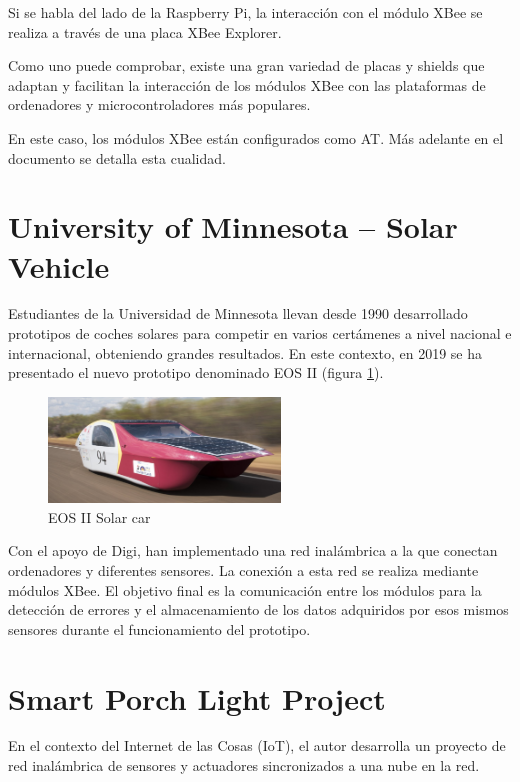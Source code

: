 Si se habla del lado de la Raspberry Pi, la interacción con el módulo XBee se realiza a través de una placa XBee Explorer.

Como uno puede comprobar, existe una gran variedad de placas y shields que adaptan y facilitan la interacción de los módulos XBee con las plataformas de ordenadores y microcontroladores más populares.

En este caso, los módulos XBee están configurados como AT. Más adelante en el documento se detalla esta cualidad.

\section{University of Minnesota – Solar Vehicle \cite{UM:SV}}

Estudiantes de la Universidad de Minnesota llevan desde 1990 desarrollado prototipos de coches solares para competir en varios certámenes a nivel nacional e internacional, obteniendo grandes resultados. En este contexto, en 2019 se ha presentado el nuevo prototipo denominado EOS II (figura \ref{fig:EArte3}). 

\begin{figure}[b]
\centering
\includegraphics[width=0.55\textwidth]{figuras/EArte3.png}
\caption{EOS II Solar car}
\label{fig:EArte3}
\end{figure}

Con el apoyo de Digi, han implementado una red inalámbrica a la que conectan ordenadores y diferentes sensores. La conexión a esta red se realiza mediante módulos XBee. El objetivo final es la comunicación entre los módulos para la detección de errores y el almacenamiento de los datos adquiridos por esos mismos sensores durante el funcionamiento del prototipo.

\section{Smart Porch Light Project \cite{SPLP:Mouser}}

En el contexto del Internet de las Cosas (IoT), el autor desarrolla un proyecto de red inalámbrica de sensores y actuadores sincronizados a una nube en la red.

